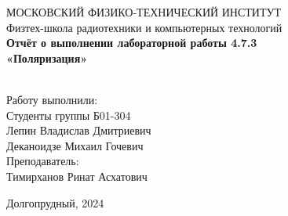 \begin{center}
МОСКОВСКИЙ ФИЗИКО-ТЕХНИЧЕСКИЙ ИНСТИТУТ \\

\hfill \break
Физтех-школа радиотехники и компьютерных технологий\\
\vspace{5cm}
\large{\textbf{Отчёт о выполнении лабораторной работы  4.7.3\\ «Поляризация»}}\\
\hfill \break
\\
\end{center}

\vspace{5cm}
 
\begin{flushright}
Работу выполнили:\\
Студенты группы Б01-304\\
Лепин Владислав Дмитриевич\\
Деканоидзе Михаил Гочевич\\
Преподаватель:\\
Тимирханов Ринат Асхатович\\
\end{flushright}
 
\vfill


\begin{center} Долгопрудный, 2024 \end{center}

\thispagestyle{empty}
\newpage